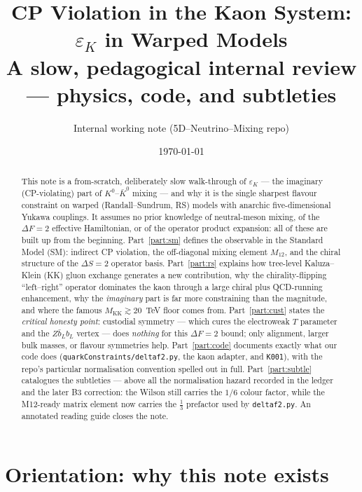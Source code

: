 \documentclass[11pt]{article}
\title{\bf CP Violation in the Kaon System: $\varepsilon_K$ in Warped Models\\[4pt]
\large A slow, pedagogical internal review --- physics, code, and subtleties}
\author{Internal working note (5D--Neutrino--Mixing repo)}
\date{\today}
\newcommand{\MKK}{M_{\mathrm{KK}}}
\newcommand{\epsK}{\varepsilon_K}
\newcommand{\Mtwelve}{M_{12}}
\newcommand{\code}[1]{\texttt{#1}}
\theoremstyle{definition}
\begin{document}
\maketitle

\begin{abstract}
\noindent
This note is a from-scratch, deliberately slow walk-through of $\epsK$ --- the
imaginary (CP-violating) part of $K^0$--$\bar K^0$ mixing --- and why it is the
single sharpest flavour constraint on warped (Randall--Sundrum, RS) models with
anarchic five-dimensional Yukawa couplings. It assumes no prior knowledge of
neutral-meson mixing, of the $\Delta F=2$ effective Hamiltonian, or of the
operator product expansion: all of these are built up from the beginning.
Part~\ref{part:sm} defines the observable in the Standard Model (SM):
indirect CP violation, the off-diagonal mixing element $\Mtwelve$, and the
chiral structure of the $\Delta S=2$ operator basis. Part~\ref{part:rs} explains
how tree-level Kaluza--Klein (KK) gluon exchange generates a new contribution,
why the chirality-flipping ``left--right'' operator dominates the kaon through a
large chiral plus QCD-running enhancement, why the \emph{imaginary} part is far
more constraining than the magnitude, and where the famous
$\MKK \gtrsim 20$~TeV floor comes from. Part~\ref{part:cust} states the
\emph{critical honesty point}: custodial symmetry --- which cures the electroweak
$T$ parameter and the $Z\bar b_L b_L$ vertex --- does \emph{nothing} for this
$\Delta F=2$ bound; only alignment, larger bulk masses, or flavour symmetries
help. Part~\ref{part:code} documents exactly what our code does
(\code{quarkConstraints/deltaf2.py}, the kaon adapter, and \code{K001}), with the
repo's particular normalisation convention spelled out in full. Part~\ref{part:subtle}
catalogues the subtleties --- above all the normalisation hazard recorded in the
ledger and the later B3 correction: the Wilson still carries the $1/6$ colour
factor, while the M12-ready matrix element now carries the $\tfrac13$ prefactor
used by \code{deltaf2.py}. An annotated reading guide closes the note.
\end{abstract}

\tableofcontents

\part*{Orientation: why this note exists}
\end{document}
